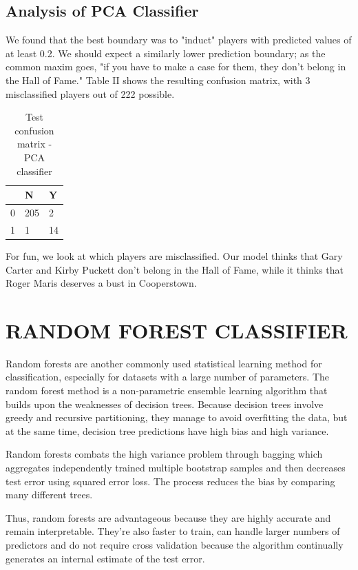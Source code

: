 \documentclass[letterpaper, 10 pt, conference]{ieeeconf}
\begin{document}
\subsection{Analysis of PCA Classifier}

We found that the best boundary was to "induct" players with predicted values of at least 0.2. We should expect a similarly lower prediction boundary; as the common maxim goes, "if you have to make a case for them, they don't belong in the Hall of Fame." Table II shows the resulting confusion matrix, with 3 misclassified players out of 222 possible.

\begin{table}[ht]
\centering
\caption{Test confusion matrix - PCA classifier}
\begin{tabular}{l|l|l|}
\cline{2-3}
                        & N   & Y  \\ \hline
\multicolumn{1}{|l|}{0} & 205 & 2  \\ \hline
\multicolumn{1}{|l|}{1} & 1   & 14 \\ \hline
\end{tabular}
\end{table}

For fun, we look at which players are misclassified. Our model thinks that Gary Carter and Kirby Puckett don't belong in the Hall of Fame, while it thinks that Roger Maris deserves a bust in Cooperstown. 

\section{RANDOM FOREST CLASSIFIER}

Random forests are another commonly used statistical learning method for classification, especially for datasets with a large number of parameters. The random forest method is a non-parametric ensemble learning algorithm that builds upon the weaknesses of decision trees. Because decision trees involve greedy and recursive partitioning, they manage to avoid overfitting the data, but at the same time, decision tree predictions have high bias and high variance.

Random forests combats the high variance problem through bagging which aggregates independently trained multiple bootstrap samples and then decreases test error using squared error loss. The process reduces the bias by comparing many different trees.

Thus, random forests are advantageous because they are highly accurate and remain interpretable. They're also faster to train, can handle larger numbers of predictors and do not require cross validation because the algorithm continually generates an internal estimate of the test error.
\end{document}
